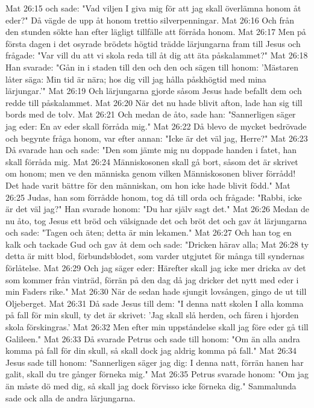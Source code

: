 Mat 26:15  och sade: "Vad viljen I giva mig för att jag skall överlämna honom åt eder?" Då vägde de upp åt honom trettio silverpenningar.
Mat 26:16  Och från den stunden sökte han efter lägligt tillfälle att förråda honom.
Mat 26:17  Men på första dagen i det osyrade brödets högtid trädde lärjungarna fram till Jesus och frågade: "Var vill du att vi skola reda till åt dig att äta påskalammet?"
Mat 26:18  Han svarade: "Gån in i staden till den och den och sägen till honom: 'Mästaren låter säga: Min tid är nära; hos dig vill jag hålla påskhögtid med mina lärjungar.'"
Mat 26:19  Och lärjungarna gjorde såsom Jesus hade befallt dem och redde till påskalammet.
Mat 26:20  När det nu hade blivit afton, lade han sig till bords med de tolv.
Mat 26:21  Och medan de åto, sade han: "Sannerligen säger jag eder: En av eder skall förråda mig."
Mat 26:22  Då blevo de mycket bedrövade och begynte fråga honom, var efter annan: "Icke är det väl jag, Herre?"
Mat 26:23  Då svarade han och sade: "Den som jämte mig nu doppade handen i fatet, han skall förråda mig.
Mat 26:24  Människosonen skall gå bort, såsom det är skrivet om honom; men ve den människa genom vilken Människosonen bliver förrådd! Det hade varit bättre för den människan, om hon icke hade blivit född."
Mat 26:25  Judas, han som förrådde honom, tog då till orda och frågade: "Rabbi, icke är det väl jag?" Han svarade honom: "Du har själv sagt det."
Mat 26:26  Medan de nu åto, tog Jesus ett bröd och välsignade det och bröt det och gav åt lärjungarna och sade: "Tagen och äten; detta är min lekamen."
Mat 26:27  Och han tog en kalk och tackade Gud och gav åt dem och sade: "Dricken härav alla;
Mat 26:28  ty detta är mitt blod, förbundsblodet, som varder utgjutet för många till syndernas förlåtelse.
Mat 26:29  Och jag säger eder: Härefter skall jag icke mer dricka av det som kommer från vinträd, förrän på den dag då jag dricker det nytt med eder i min Faders rike."
Mat 26:30  När de sedan hade sjungit lovsången, gingo de ut till Oljeberget.
Mat 26:31  Då sade Jesus till dem: "I denna natt skolen I alla komma på fall för min skull, ty det är skrivet: 'Jag skall slå herden, och fåren i hjorden skola förskingras.'
Mat 26:32  Men efter min uppståndelse skall jag före eder gå till Galileen."
Mat 26:33  Då svarade Petrus och sade till honom: "Om än alla andra komma på fall för din skull, så skall dock jag aldrig komma på fall."
Mat 26:34  Jesus sade till honom: "Sannerligen säger jag dig: I denna natt, förrän hanen har galit, skall du tre gånger förneka mig."
Mat 26:35  Petrus svarade honom: "Om jag än måste dö med dig, så skall jag dock förvisso icke förneka dig." Sammalunda sade ock alla de andra lärjungarna.

